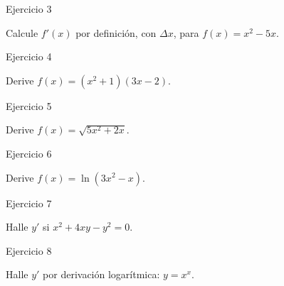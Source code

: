 \documentclass[aspectratio=169]{beamer}
\begin{document}
\begin{frame}{Ejercicio 3}
  \begin{mwejercicio}
    Calcule $f'(x)$ por definición, con $\Delta x$, para $f(x) = x^{2} - 5x$.
  \end{mwejercicio}
  \vspace{3.5cm}
\end{frame}

\begin{frame}{Ejercicio 4}
  \begin{mwejercicio}
    Derive $f(x) = (x^{2}+1)(3x-2)$.
  \end{mwejercicio}
  \vspace{3.5cm}
\end{frame}

\begin{frame}{Ejercicio 5}
  \begin{mwejercicio}
    Derive $f(x) = \sqrt{5x^{2} + 2x}$.
  \end{mwejercicio}
  \vspace{3.5cm}
\end{frame}

\begin{frame}{Ejercicio 6}
  \begin{mwejercicio}
    Derive $f(x) = \ln(3x^{2} - x)$.
  \end{mwejercicio}
  \vspace{3.5cm}
\end{frame}

\begin{frame}{Ejercicio 7}
  \begin{mwejercicio}
    Halle $y'$ si $x^{2} + 4xy - y^{2} = 0$.
  \end{mwejercicio}
  \vspace{3.5cm}
\end{frame}

\begin{frame}{Ejercicio 8}
  \begin{mwejercicio}
    Halle $y'$ por derivación logarítmica: $y = x^{x}$.
  \end{mwejercicio}
  \vspace{3.5cm}
\end{frame}
\end{document}
